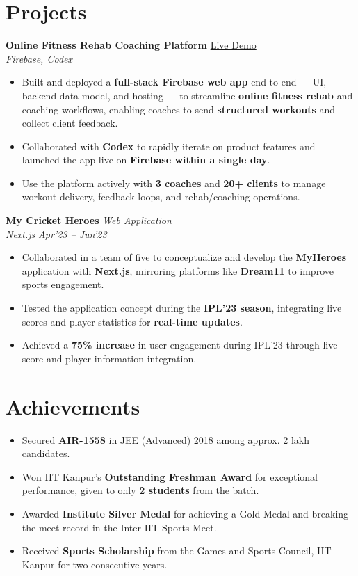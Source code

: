 \documentclass[10pt,a4paper]{article}
\newcommand{\resumeItem}[1]{\item[\textcolor{primary}{\textbullet}] #1}
\begin{document}
\section{Projects}
\small

\textbf{Online Fitness Rehab Coaching Platform} \hfill \href{https://workout-planner-app-e7087.firebaseapp.com/}{Live Demo}\\
\textit{Firebase, Codex}
\begin{itemize}[leftmargin=1.05em, nosep, topsep=0pt, itemsep=0pt, parsep=0pt]
    \resumeItem{Built and deployed a \textbf{full-stack Firebase web app} end-to-end --- UI, backend data model, and hosting --- to streamline \textbf{online fitness rehab} and coaching workflows, enabling coaches to send \textbf{structured workouts} and collect client feedback.}
    \resumeItem{Collaborated with \textbf{Codex} to rapidly iterate on product features and launched the app live on \textbf{Firebase within a single day}.}
    \resumeItem{Use the platform actively with \textbf{3 coaches} and \textbf{20+ clients} to manage workout delivery, feedback loops, and rehab/coaching operations.}
\end{itemize}

\vspace{1pt}
\textbf{My Cricket Heroes} \hfill \textit{Web Application}\\
\textit{Next.js} \hfill \textit{Apr'23 -- Jun'23}
\begin{itemize}[leftmargin=1.05em, nosep, topsep=0pt, itemsep=0pt, parsep=0pt]
    \resumeItem{Collaborated in a team of five to conceptualize and develop the \textbf{MyHeroes} application with \textbf{Next.js}, mirroring platforms like \textbf{Dream11} to improve sports engagement.}
    \resumeItem{Tested the application concept during the \textbf{IPL'23 season}, integrating live scores and player statistics for \textbf{real-time updates}.}
    \resumeItem{Achieved a \textbf{75\% increase} in user engagement during IPL'23 through live score and player information integration.}
\end{itemize}

\section{Achievements}
\small
\begin{itemize}[leftmargin=1.05em, nosep, topsep=0pt, itemsep=0pt, parsep=0pt]
    \resumeItem{Secured \textbf{AIR-1558} in JEE (Advanced) 2018 among approx. 2 lakh candidates.}
\resumeItem{Won IIT Kanpur's \textbf{Outstanding Freshman Award} for exceptional performance, given to only \textbf{2 students} from the batch.}
    \resumeItem{Awarded \textbf{Institute Silver Medal} for achieving a Gold Medal and breaking the meet record in the Inter-IIT Sports Meet.}
    \resumeItem{Received \textbf{Sports Scholarship} from the Games and Sports Council, IIT Kanpur for two consecutive years.}
\end{itemize}
\end{document}
